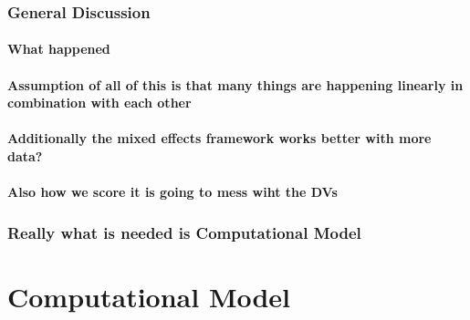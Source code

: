\documentclass[]{book}
\theoremstyle{definition}
\theoremstyle{definition}
\theoremstyle{definition}
\theoremstyle{remark}
\begin{document}
\hypertarget{general-discussion}{%
\subsection{General Discussion}\label{general-discussion}}

\hypertarget{what-happened}{%
\subsubsection{What happened}\label{what-happened}}

\hypertarget{assumption-of-all-of-this-is-that-many-things-are-happening-linearly-in-combination-with-each-other}{%
\subsubsection{Assumption of all of this is that many things are
happening linearly in combination with each
other}\label{assumption-of-all-of-this-is-that-many-things-are-happening-linearly-in-combination-with-each-other}}

\hypertarget{additionally-the-mixed-effects-framework-works-better-with-more-data}{%
\subsubsection{Additionally the mixed effects framework works better
with more
data?}\label{additionally-the-mixed-effects-framework-works-better-with-more-data}}

\hypertarget{also-how-we-score-it-is-going-to-mess-wiht-the-dvs}{%
\subsubsection{Also how we score it is going to mess wiht the
DVs}\label{also-how-we-score-it-is-going-to-mess-wiht-the-dvs}}

\hypertarget{really-what-is-needed-is-computational-model}{%
\subsection{Really what is needed is Computational
Model}\label{really-what-is-needed-is-computational-model}}

\hypertarget{computational-model}{%
\chapter{Computational Model}\label{computational-model}}
\end{document}
